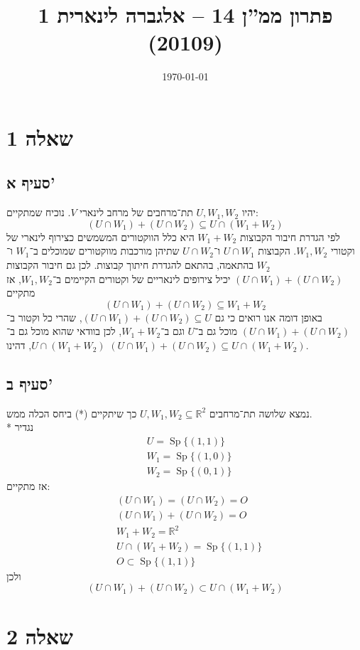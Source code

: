 \documentclass[a4paper]{article}
\title{פתרון ממ''ן 14 – אלגברה לינארית 1 (20109)}
\author{\AUTHOR}
\date\today
\DeclareMathOperator\Sp{Sp}
\def\RR{\mathbb{R}}
\begin{document}
\maketitle
\section{שאלה 1}
\subsection{סעיף א'}
יהיו $U, W_1, W_2$ תת־מרחבים של מרחב לינארי $V$.
נוכיח שמתקיים:
\[
	(U \cap W_1) +
	(U \cap W_2) \subseteq
	U \cap (W_1 + W_2)
	\tag{*}
\]
לפי הגדרת חיבור הקבוצות
$W_1 + W_2$ היא כלל הווקטורים המשמשים כצירוף לינארי של וקטורי $W_1, W_2$.
הקבוצות $U \cap W_1$ ו־$U \cap W_2$ שתיהן מורכבות מווקטורים שמוכלים ב־$W_1$ ו־$W_2$ בהתאמה, בהתאם להגדרת חיתוך קבוצות.
לכן גם חיבור הקבוצות $(U \cap W_1) + (U \cap W_2)$
יכיל צירופים לינאריים של וקטורים הקיימים ב־$W_1, W_2$, אז מתקיים
\[
	(U \cap W_1) +
	(U \cap W_2) \subseteq
	W_1 + W_2
\]
באופן דומה אנו רואים כי גם
$(U \cap W_1) + (U \cap W_2) \subseteq U$,
שהרי כל וקטור ב־$(U \cap W_1) + (U \cap W_2)$
מוכל גם ב־$U$ וגם ב־$W_1 + W_2$,
לכן בוודאי שהוא מוכל גם ב־$U \cap (W_1 + W_2)$,
דהינו $(U \cap W_1) + (U \cap W_2) \subseteq U \cap (W_1 + W_2)$.

\subsection{סעיף ב'}
נמצא שלושה תת־מרחבים $U, W_1, W_2 \subseteq \RR^2$
כך שיתקיים (*) ביחס הכלה ממש. \\*
נגדיר
\begin{align*}
	& U = \Sp\{(1, 1)\} \\
	& W_1 = \Sp\{(1, 0)\} \\
	& W_2 = \Sp\{(0, 1)\}
\end{align*}
אז מתקיים:
\[
	\begin{aligned}
		& (U \cap W_1) = (U \cap W_2) = O \\
		& (U \cap W_1) + (U \cap W_2) = O \\
		& W_1 + W_2 = \RR^2 \\
		& U \cap (W_1 + W_2) = \Sp\{(1, 1)\} \\
		& O \subset \Sp\{(1, 1)\}
	\end{aligned}
\]
ולכן
\[
	(U \cap W_1) + (U \cap W_2) \subset U \cap (W_1 + W_2)
\]

\section{שאלה 2}
\end{document}

